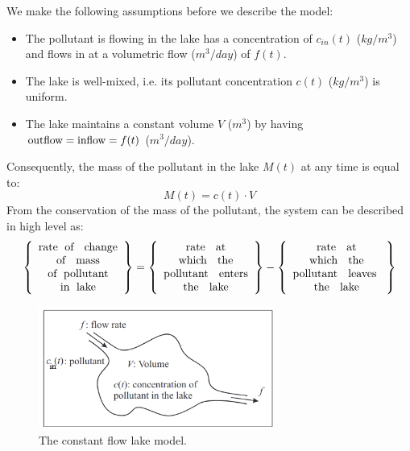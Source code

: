 \documentclass[a4paper]{article}
\begin{document}
We make the following assumptions before we describe the model:
\begin{itemize}
    \item {}The pollutant is flowing in the lake has a concentration of $c_{in}(t)$ ($kg/m^3$) and flows in at a volumetric flow ($m^3/day$) of $f(t)$. 
    \item The lake is well-mixed, i.e. its pollutant concentration $c(t)$ ($kg/m^3$) is uniform.
    \item The lake maintains a constant volume $V$ ($m^3$) by having $\textup{outflow} = \textup{inflow} = f(t)$ ($m^3/day$).
\end{itemize}
Consequently, the mass of the pollutant in the lake $M(t)$ at any time is equal to:
\[
    M(t) = c(t)\cdot V 
    \tag{1}
\]
From the conservation of the mass of the pollutant, the system can be described in high level as:
\[
   \left \{ \begin{array}{c}
      \textup{rate\;  of \; change} \\
      \textup{of \; mass} \\
      \textup{of\;  pollutant} \\
      \textup{in\;  lake}
   \end{array} \right \}
   = 
      \left \{ \begin{array}{c}
      \textup{rate \; at} \\
      \textup{which \; the} \\
      \textup{pollutant \; enters} \\
      \textup{the \; lake} 
   \end{array} \right \} - 
      \left \{ \begin{array}{c}
      \textup{rate \; at} \\
      \textup{which  \; the} \\
      \textup{pollutant \; leaves } \\
      \textup{the \; lake}
   \end{array} \right \}
\]
\begin{figure}[H]
    \centering
    \includegraphics[height=4cm]{img/lake/lake_model_diagram.png}
    \caption{The constant flow lake model.}
    \label{fig:my_label}
\end{figure}
\end{document}
